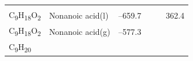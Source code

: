 \documentclass[
  9pt,
]{extbook}
\theoremstyle{definition}
\theoremstyle{definition}
\theoremstyle{definition}
\theoremstyle{remark}
\begin{document}
\begin{longtable}[]{@{}llllll@{}}
\begin{minipage}[t]{0.15\columnwidth}
\strut
\end{minipage} & \begin{minipage}[t]{0.14\columnwidth}\raggedright
\strut
\end{minipage} & \begin{minipage}[t]{0.14\columnwidth}\raggedright
\strut
\end{minipage}\tabularnewline
\begin{minipage}[t]{0.07\columnwidth}\raggedright
C\textsubscript{9}H\textsubscript{18}O\textsubscript{2}\strut
\end{minipage} & \begin{minipage}[t]{0.17\columnwidth}\raggedright
Nonanoic acid(l)\strut
\end{minipage} & \begin{minipage}[t]{0.15\columnwidth}\raggedright
--659.7\strut
\end{minipage} & \begin{minipage}[t]{0.15\columnwidth}\raggedright
\strut
\end{minipage} & \begin{minipage}[t]{0.14\columnwidth}\raggedright
\strut
\end{minipage} & \begin{minipage}[t]{0.14\columnwidth}\raggedright
362.4\strut
\end{minipage}\tabularnewline
\begin{minipage}[t]{0.07\columnwidth}\raggedright
C\textsubscript{9}H\textsubscript{18}O\textsubscript{2}\strut
\end{minipage} & \begin{minipage}[t]{0.17\columnwidth}\raggedright
Nonanoic acid(g)\strut
\end{minipage} & \begin{minipage}[t]{0.15\columnwidth}\raggedright
--577.3\strut
\end{minipage} & \begin{minipage}[t]{0.15\columnwidth}\raggedright
\strut
\end{minipage} & \begin{minipage}[t]{0.14\columnwidth}\raggedright
\strut
\end{minipage} & \begin{minipage}[t]{0.14\columnwidth}\raggedright
\strut
\end{minipage}\tabularnewline
\begin{minipage}[t]{0.07\columnwidth}\raggedright
C\textsubscript{9}H\textsubscript{20}\strut
\end{minipage} & \begin{minipage}[t]{0.17\columnwidth}\raggedright

\end{minipage}
\end{longtable}
\end{document}
